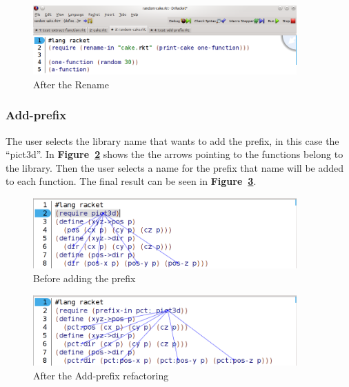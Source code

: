\begin{figure}[htbp]
	\centering
	\includegraphics[width=0.9\textwidth]{img/renameV2-2.png}
	\caption{After the Rename}
	\label{fig:renameAfter}
\end{figure}

\subsubsection{Add-prefix}

The user selects the library name that wants to add the prefix, in this case the ``pict3d''.
In {\bf Figure~\ref{fig:addPrefixBefore}} shows the the arrows pointing to the functions belong to the library.
Then the user selects a name for the prefix that name will be added to each function.
The final result can be seen in {\bf Figure~\ref{fig:addPrefixAfter}}.

\begin{figure}[htbp]
	\centering
	\includegraphics[width=0.9\textwidth]{img/add-prefixV2-1.png}
	\caption{Before adding the prefix}
	\label{fig:addPrefixBefore}
\end{figure}


\begin{figure}[htbp]
	\centering
	\includegraphics[width=0.9\textwidth]{img/add-prefixV2-3.png}
	\caption{After the Add-prefix refactoring}
	\label{fig:addPrefixAfter}
\end{figure}